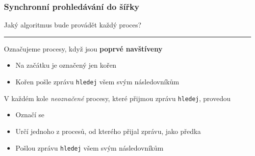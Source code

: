 \documentclass[usenames,dvipsnames,9pt]{beamer}
\begin{document}
\begin{frame}
\begin{center}
%
\end{center}
\end{frame}

\begin{frame}
\frametitle{Synchronní prohledávání do šířky}

\begin{center}
Jaký algoritmus bude provádět každý proces?
\end{center}

  \pause\vspace{1em}\hrule\vspace{1em}

Označujeme procesy, když jsou {\bf poprvé navštíveny}
\begin{itemize}
\item Na začátku je označený jen kořen
\item Kořen pošle zprávu \texttt{hledej} všem svým následovníkům
\end{itemize}
\pause
V každém kole \textit{neoznačené} procesy, které přijmou zprávu \texttt{hledej}, provedou
\begin{itemize}
\item Označí se
\item Určí jednoho z procesů, od kterého přijal zprávu, jako předka
\item Pošlou zprávu \texttt{hledej} všem svým následovníkům
\end{itemize}



\end{frame}
\end{document}
